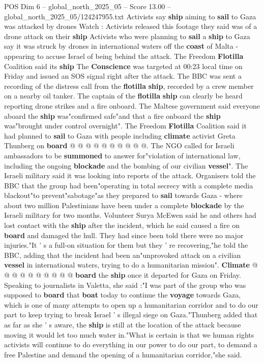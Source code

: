 \begin{textsample}{POS Dim 6 – global\_north\_2025\_05 – Score 13.00 – global\_north\_2025\_05/124247955.txt}  \label{ex:f6_pos_062}
Activists say \textbf{ship} aiming to \textbf{sail} to Gaza was attacked by drones Watch : Activists released this footage they said was of a drone attack on their \textbf{ship} Activists who were planning to \textbf{sail} a \textbf{ship} to Gaza say it was struck by drones in international waters off the \textbf{coast} of Malta - appearing to accuse Israel of being behind the attack.
The Freedom \textbf{Flotilla} Coalition said its \textbf{ship} The \textbf{Conscience} was targeted at 00:23 local time on Friday and issued an SOS signal right after the attack.
The BBC was sent a recording of the distress call from the \textbf{flotilla} \textbf{ship}, recorded by a crew member on a nearby oil tanker.
The captain of the \textbf{flotilla} \textbf{ship} can clearly be heard reporting drone strikes and a fire onboard.
The Maltese government said everyone aboard the \textbf{ship} was"confirmed safe"and that a fire onboard the \textbf{ship} was"brought under control overnight".
The Freedom \textbf{Flotilla} Coalition said it had planned to \textbf{sail} to Gaza with people including \textbf{climate} activist Greta Thunberg on \textbf{board} @ @ @ @ @ @ @ @ @ @.
The NGO called for Israeli ambassadors to be \textbf{summoned} to answer for"violation of international law, including the ongoing \textbf{blockade} and the bombing of our civilian \textbf{vessel}".
The Israeli military said it was looking into reports of the attack.
Organisers told the BBC that the group had been"operating in total secrecy with a complete media blackout"to prevent"sabotage"as they prepared to \textbf{sail} towards Gaza - where about two million Palestinians have been under a complete \textbf{blockade} by the Israeli military for two months.
Volunteer Surya McEwen said he and others had lost contact with the \textbf{ship} after the incident, which he said caused a fire on \textbf{board} and damaged the hull.
They had since been told there were no major injuries."It ' s a full-on situation for them but they ' re recovering,"he told the BBC, adding that the incident had been an"unprovoked attack on a civilian \textbf{vessel} in international waters, trying to do a humanitarian mission". \textbf{Climate} @ @ @ @ @ @ @ @ @ @ \textbf{board} the \textbf{ship} once it departed for Gaza on Friday.
Speaking to journalists in Valetta, she said :"I was part of the group who was supposed to \textbf{board} that \textbf{boat} today to continue the \textbf{voyage} towards Gaza, which is one of many attempts to open up a humanitarian corridor and to do our part to keep trying to break Israel ' s illegal siege on Gaza."Thunberg added that as far as she ' s aware, the \textbf{ship} is still at the location of the attack because moving it would let too much water in."What is certain is that we human rights activists will continue to do everything in our power to do our part, to demand a free Palestine and demand the opening of a humanitarian corridor,"she said.

\end{textsample}
